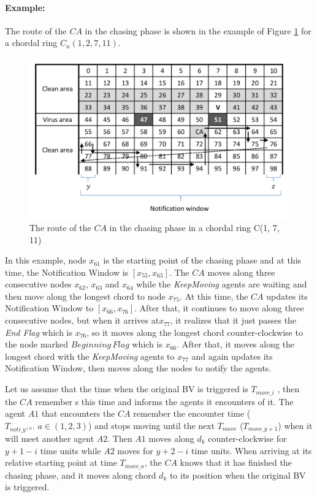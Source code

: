 \paragraph {\bf Example:} 
The route of the $CA$ in the chasing phase is shown in the  example of Figure \ref{fig:chasing} for a  chordal ring $C_n(1, 2, 7, 11)$. 
\begin{figure}[H]
  \centering  
  \includegraphics[width=1.0\textwidth]{figures/chasing.png}
  \caption{The route of the $CA$ in the chasing phase in a chordal ring C(1, 7, 11)}\label{fig:chasing}
\end{figure}
In this example, node $x_{61}$ is the starting point of the chasing phase and at this time, the Notification Window is $[x_{55}, x_{65}]$. The $CA$ moves along three consecutive nodes $x_{62}$, $x_{63}$ and $x_{64}$ while the {\em KeepMoving} agents are waiting and then move along the longest chord to node $x_{75}$. At this time, the $CA$ updates its Notification Window to $[x_{66}, x_{76}]$. After that, it continues to move along three consecutive nodes, but when it arrives  at$x_{77}$, it realizes that it just passes the {\em End Flag} which is $x_{76}$, so it moves along the longest chord  counter-clockwise to the node marked   $Beginning\,Flag$ which is $x_{66}$. After that, it moves along the longest chord with the {\em KeepMoving} agents to $x_{77}$ and again updates its Notification Window, then moves along the nodes to notify the agents.

Let us assume that the time when the original BV is triggered is $T_{move\_i}$ , then the $CA$   remember s this time   and informs the agents it  encounters of it. The agent $A1$ that  encounters the $CA$   remember the encounter time   ($T_{noti\_y^{(a)}}\,a\in(1,2,3)$) and stops moving until the next $T_{move}$ ($T_{move\_{y+1}}$) when it will meet another agent $A2$. Then $A1$ moves along $d_k$ counter-clockwise for $y+1-i$ time units while $A2$ moves for $y+2-i$ time units. 
When arriving at its relative starting point at  time  $T_{move\_a}$, the $CA$ knows that it has finished the chasing phase,  and it moves along  chord $d_k$ to its position when the original BV is triggered.



